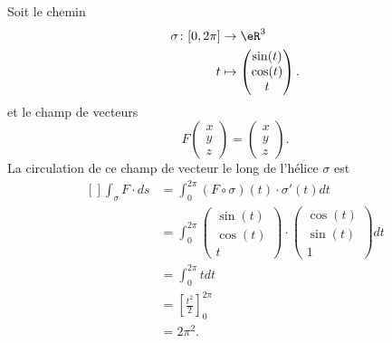 \begin{example}
    Soit le chemin
    \begin{equation}
        \begin{aligned}
            \sigma\colon \mathopen[ 0 , 2\pi \mathclose]&\to \eR^3 \\
            t&\mapsto \begin{pmatrix}
                \sin(t)    \\ 
                \cos(t)    \\ 
                t    
            \end{pmatrix}.
        \end{aligned}
    \end{equation}
    et le champ de vecteurs
    \begin{equation}
        F\begin{pmatrix}
            x    \\ 
            y    \\ 
            z    
        \end{pmatrix}=\begin{pmatrix}
            x    \\ 
            y    \\ 
            z    
        \end{pmatrix}.
    \end{equation}
    La circulation de ce champ de vecteur le long de l'hélice $\sigma$ est
    \begin{equation}
        \begin{aligned}[]
            \int_{\sigma}F\cdot ds&=\int_0^{2\pi}(F\circ \sigma)(t)\cdot \sigma'(t)dt\\
            &=\int_0^{2\pi}\begin{pmatrix}
                \sin(t)    \\ 
                \cos(t)    \\ 
                t    
            \end{pmatrix}\cdot
            \begin{pmatrix}
                \cos(t)    \\ 
                \sin(t)    \\ 
                1    
            \end{pmatrix}dt\\
            &=\int_0^{2\pi}tdt\\
            &=\left[ \frac{ t^2 }{2} \right]_0^{2\pi}\\
            &=2\pi^2.
        \end{aligned}
    \end{equation}
    
\end{example}

